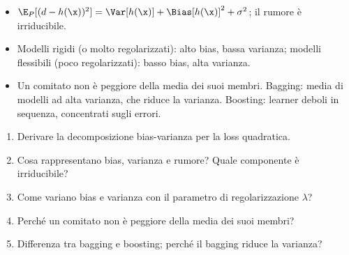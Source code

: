 \begin{puntichiave}
\begin{itemize}
  \item $\E_P[(d-h(\x))^2] = \Var[h(\x)] + \Bias[h(\x)]^2 + \sigma^2$; il rumore è irriducibile.
  \item Modelli rigidi (o molto regolarizzati): alto bias, bassa varianza; modelli flessibili (poco regolarizzati):
        basso bias, alta varianza.
  \item Un comitato non è peggiore della media dei suoi membri. Bagging: media di modelli ad alta varianza, che
        riduce la varianza. Boosting: learner deboli in sequenza, concentrati sugli errori.
\end{itemize}
\end{puntichiave}

\begin{domande}
\begin{enumerate}
  \item Derivare la decomposizione bias-varianza per la loss quadratica.
  \item Cosa rappresentano bias, varianza e rumore? Quale componente è irriducibile?
  \item Come variano bias e varianza con il parametro di regolarizzazione $\lambda$?
  \item Perché un comitato non è peggiore della media dei suoi membri?
  \item Differenza tra bagging e boosting; perché il bagging riduce la varianza?
\end{enumerate}
\end{domande}
